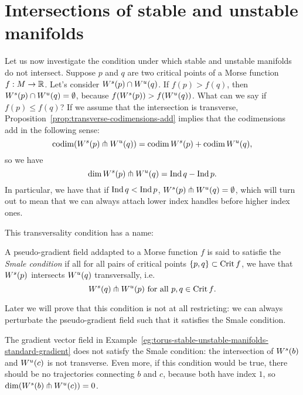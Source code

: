     \section{Intersections of stable and unstable manifolds}
    Let us now investigate the condition under which stable and unstable manifolds do not intersect.
    Suppose $p$ and $q$ are two critical points of a Morse function $f: M \to  \mathbb{R}$.
    Let's consider $W^s(p) \cap W^u(q)$.
    If $f(p) > f(q)$, then  $W^s(p) \cap W^u(q) = \emptyset$, because $f(W^s(p)) > f(W^u(q))$.
    What can we say if $f(p) \le  f(q)$?
    If we assume that the intersection is transverse, Proposition~\ref{prop:transverse-codimensions-add} implies that the codimensions add in the following sense:
    \[
        \operatorname{codim}(W^s(p) \pitchfork  W^u(q)) = \operatorname{codim} W^s(p) + \operatorname{codim} W^u(q)
    ,\] 
    so we have
    \[
        \dim W^s(p) \pitchfork W^u(q) = \operatorname{Ind} q - \operatorname{Ind} p
    .\]
    In particular, we have that if $\operatorname{Ind} q < \operatorname{Ind} p$,  $W^s(p) \pitchfork W^u(q) = \emptyset$, which will turn out to mean that we can always attach lower index handles before higher index ones.


    This transversality condition has a name:
    \begin{definition}
        A pseudo-gradient field addapted to a Morse function $f$ is said to satisfie the \emph{Smale condition} if all for all pairs of critical points $ \{p, q\}  \subset \operatorname{Crit} f$, we have that $W^s(p)$ intersects  $W^u(q)$ transversally, i.e. 
        \[
            W^s(q) \pitchfork  W^u(p) \text{ for all $p, q \in \operatorname{Crit} f$}
        .\] 
    \end{definition}
    Later we will prove that this condition is not at all restricting: we can always perturbate the pseudo-gradient field such that it satisfies the Smale condition.

    \begin{noneg}
        The gradient vector field in Example~\ref{eg:torus-stable-unstable-manifolds-standard-gradient} does not satisfy the Smale condition: the intersection of $W^s(b)$ and  $W^u(c)$ is not transverse.
        Even more, if this condition would be true, there should be no trajectories connecting $b$ and $c$, because both have index $1$, so $\dim (W^s(b) \pitchfork W^u(c)) = 0$.
    \end{noneg}

